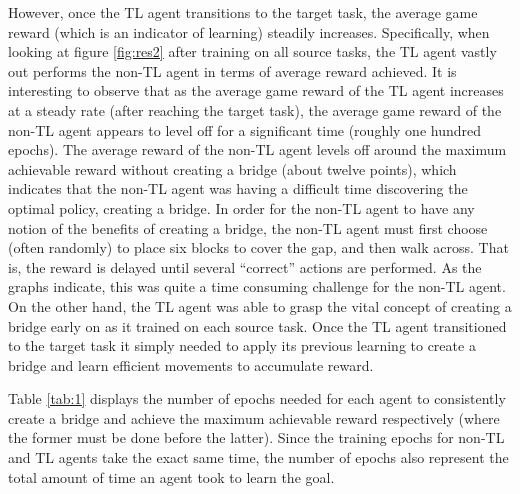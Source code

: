 \documentclass{llncs}
\begin{document}
However, once the TL agent transitions to the target task, the average game reward (which is an indicator of learning) steadily increases.
Specifically, when looking at figure \ref{fig:res2} after training on all source tasks, the TL agent vastly out performs the non-TL agent in terms of average reward achieved.
It is interesting to observe that as the average game reward of the TL agent increases at a steady rate (after reaching the target task), the average game reward of the non-TL agent appears to level off for a significant time (roughly one hundred epochs).
The average reward of the non-TL agent levels off around the maximum achievable reward without creating a bridge (about twelve points), which indicates that the non-TL agent was having a difficult time discovering the optimal policy, creating a bridge. 
In order for the non-TL agent to have any notion of the benefits of creating a bridge, the non-TL agent must first choose (often randomly) to place six blocks to cover the gap, and then walk across.
That is, the reward is delayed until several ``correct'' actions are performed. 
As the graphs indicate, this was quite a time consuming challenge for the non-TL agent. 
On the other hand, the TL agent was able to grasp the vital concept of creating a bridge early on as it trained on each source task. 
Once the TL agent transitioned to the target task it simply needed to apply its previous learning to create a bridge and learn efficient movements to accumulate reward. 

Table \ref{tab:1} displays the number of epochs needed for each agent to consistently create a bridge and achieve the maximum achievable reward respectively (where the former must be done before the latter). 
Since the training epochs for non-TL and TL agents take the exact same time, the number of epochs also represent the total amount of time an agent took to learn the goal. 
\end{document}
